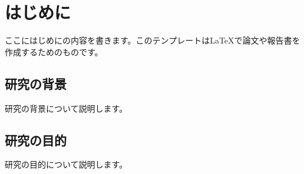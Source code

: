 \section{はじめに}

ここにはじめにの内容を書きます。このテンプレートは\LaTeX{}で論文や報告書を作成するためのものです。

\subsection{研究の背景}

研究の背景について説明します。

\subsection{研究の目的}

研究の目的について説明します。 